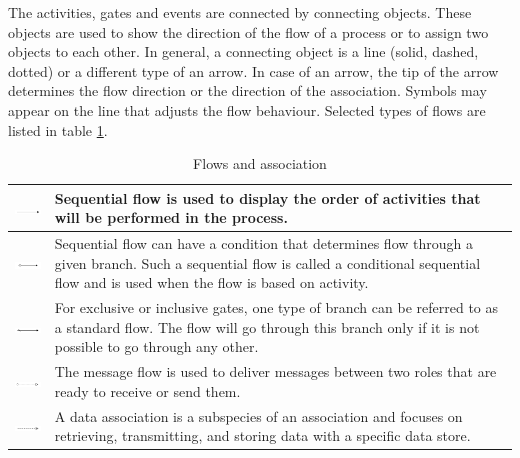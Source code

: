 \documentclass[thesis=M,english]{FITthesis}[2019/12/23]
\begin{document}
The activities, gates and events are connected by connecting objects. These objects are used to show the direction of the flow of a process or to assign two objects to each other. In general, a connecting object is a line (solid, dashed, dotted) or a different type of an arrow. In case of an arrow, the tip of the arrow determines the flow direction or the direction of the association. Symbols may appear on the line that adjusts the flow behaviour. Selected types of flows are listed in table \ref{tableFlow}.


\begin{table}[ht!]
\caption{Flows and association} \label{tableFlow}
\begin{center}
\begin{tabular}{ | p{2cm} | m{9cm} | } \hline
    \includegraphics[width=2cm]{assets/BPNMicons/SekvencnyTok.pdf} & Sequential flow is used to display the order of activities that will be performed in the process. \\   \hline
    \includegraphics[width=2cm]{assets/BPNMicons/PodmienenyTok.pdf} & Sequential flow can have a condition that determines flow through a given branch. Such a sequential flow is called a conditional sequential flow and is used when the flow is based on activity.   \\  \hline
    \includegraphics[width=2cm]{assets/BPNMicons/StandartnyTok.pdf} & For exclusive or inclusive gates, one type of branch can be referred to as a standard flow. The flow will go through this branch only if it is not possible to go through any other. \\ \hline
    \includegraphics[width=2cm]{assets/BPNMicons/TokPreSpravy.pdf} & The message flow is used to deliver messages between two roles that are ready to receive or send them.   \\ \hline
    \includegraphics[width=2cm]{assets/BPNMicons/AsociaciaDat.pdf} & A data association is a subspecies of an association and focuses on retrieving, transmitting, and storing data with a specific data store.   \\  \hline
\end{tabular}
\end{center}
\end{table}
\end{document}
